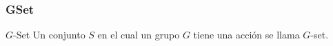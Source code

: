 \begin{frame}\frametitle{GSet}
    \begin{block}{$G$-Set}
        Un conjunto $S$ en el cual un grupo $G$ tiene una acci\'on se llama $G$-set.
    \end{block}
\begin{AgdaAlign}
\begin{code}%
\>[0]\AgdaSpace{}%
\AgdaSpace{}%
\AgdaSymbol{:}\AgdaSpace{}%
\AgdaSpace{}%
\AgdaOperator{\AgdaFunction{\AgdaUnderscore{}}}
\<%
\\
\>[0][@{}l@{\AgdaIndent{0}}]%
\>[2][@{}l@{\AgdaIndent{0}}]%
\>[5]\<%
\\
\>[5][@{}l@{\AgdaIndent{0}}]%
\>[7]\AgdaSpace{}%
\AgdaSymbol{:}\AgdaSpace{}%
\AgdaSpace{}%
\AgdaSpace{}%
\<%
\\
%
\>[7]\AgdaSpace{}%
\AgdaSymbol{:}\AgdaSpace{}%
\AgdaSpace{}%
\AgdaSymbol{(}\AgdaSpace{}%
\AgdaSpace{}%
\AgdaSymbol{)}\AgdaSpace{}%
\<%
\\
%
\>[7]\AgdaSpace{}%
\AgdaSymbol{:}\AgdaSpace{}%
\AgdaSpace{}%

\end{code}
\end{AgdaAlign}
\end{frame}